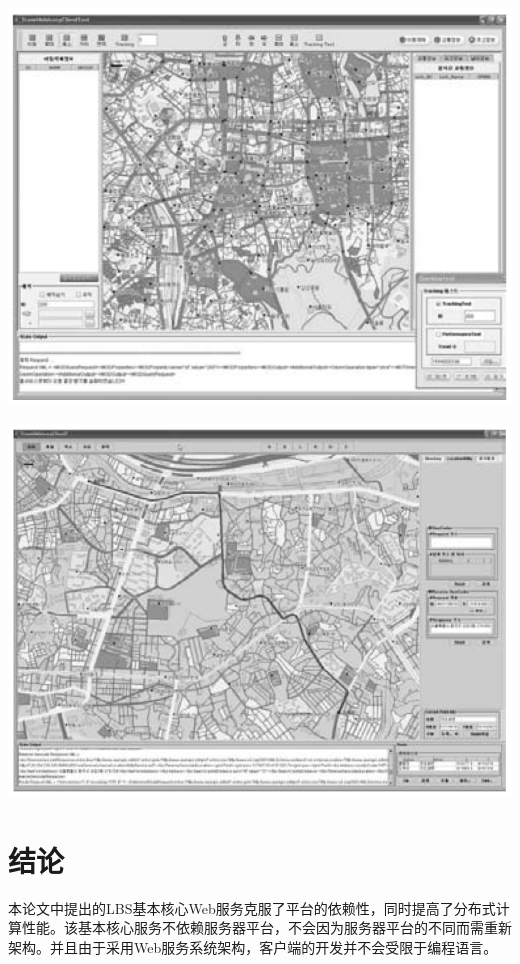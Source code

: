 \documentclass{article}
\begin{document}
\begin{CJK}{UTF8}{gbsn}
	\noindent\begin{minipage}{\textwidth}
		\centering
		\includegraphics[bb=0 0 769 607, scale=0.45]{figure/fig15.png}
	\end{minipage}

	\noindent\begin{minipage}{\textwidth}
		\centering
		\includegraphics[bb=0 0 770 569, scale=0.45]{figure/fig16.png}
	\end{minipage}


	\section{结论}
	本论文中提出的LBS基本核心Web服务克服了平台的依赖性，同时提高了分布式计算性能。该基本核心服务不依赖服务器平台，不会因为服务器平台的不同而需重新架构。并且由于采用Web服务系统架构，客户端的开发并不会受限于编程语言。


	

	\end{CJK}
\end{document}

